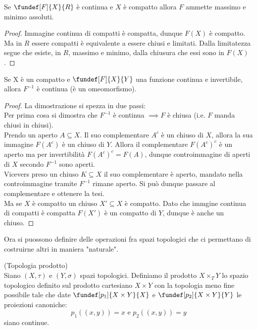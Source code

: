 \begin{lemma}
Se $\fundef[F]{X}{R}$ è continua e $X$ è compatto allora $F$ ammette massimo e minimo assoluti.
\end{lemma}
\begin{proof}
Immagine continua di compatti è compatta, dunque $F(X)$ è compatto. Ma in $R$ essere compatti è equivalente a essere chiusi e limitati. Dalla limitatezza segue che esiste, in $R$, massimo e minimo, dalla chiusura che essi sono in $F(X)$.
\end{proof}

\begin{lemma}
Se X è un compatto e  $\fundef[F]{X}{Y}$ una funzione continua e invertibile, allora $F^{-1}$ è continua (è un omeomorfismo).
\end{lemma}
\begin{proof}
La dimostrazione si spezza in due passi:\\
Per prima cosa si dimostra che $F^{-1}$ è continua $\implies F$ è chiusa (i.e. $F$ manda chiusi in chiusi).\\ 
Prendo un aperto $A\subseteq X$. Il suo complementare $A^c$ è un chiuso di $X$, allora la sua immagine $F(A^c)$ è un chiuso di $Y$. Allora il complementare  $F(A^c)^c$ è un aperto ma per invertibilità $F(A^c)^c=F(A)$, dunque controimmagine di aperti di $X$ secondo $F^{-1}$ sono aperti.\\
Vicevers preso un chiuso $K \subseteq X$ il suo complementare è aperto, mandato nella controimmagine tramite $F^{-1}$ rimane aperto. Si può dunque passare al complementare e ottenere la tesi.\\
Ma se $X$ è compatto un chiuso $X'\subseteq X$ è compatto. Dato che immgine continua di compatti è compatta $F(X')$ è un compatto di $Y$, dunque è anche un chiuso.    
\end{proof}
Ora si puossono definire delle operazioni fra spazi topologici che ci permettano di costruirne altri in maniera "naturale".\\

\begin{defn}
(Topologia prodotto)\\
Siano $(X,\tau)$ e $(Y, \sigma)$ spazi topologici. Definiamo il prodotto $X\times_T Y$ lo spazio topologico definito sul prodotto cartesiano $X\times Y$ con la topologia meno fine possibile tale che date $\fundef[p_1]{X\times Y}{X}$ e $\fundef[p_2]{X\times Y}{Y}$ le proiezioni canoniche:
\begin{equation}
 p_1((x, y))=x \text{  e  } p_2((x, y))=y
\end{equation} 
siano continue.
\end{defn}

